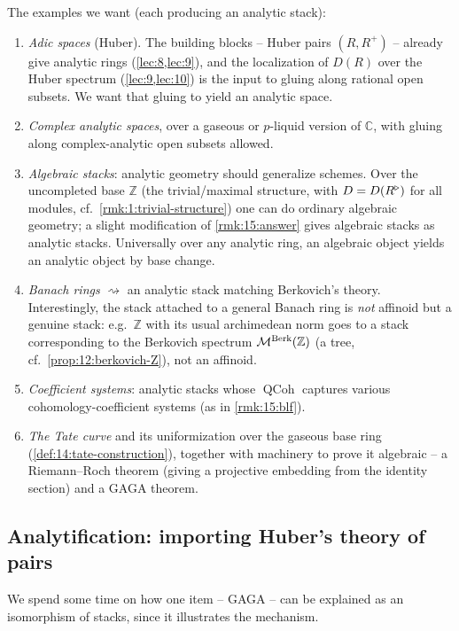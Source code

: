 \begin{remark}[Desiderata]
\label{rmk:15:desiderata}
The examples we want (each producing an analytic stack):
\begin{enumerate}
\item \emph{Adic spaces} (Huber). The building blocks -- Huber pairs $(R,R^+)$ --
already give analytic rings (\cref{lec:8,lec:9}), and the localization of
$D(R)$ over the Huber spectrum (\cref{lec:9,lec:10}) is the input to gluing along
rational open subsets. We want that gluing to yield an analytic space.
\item \emph{Complex analytic spaces}, over a gaseous or $p$-liquid version of
$\mathbb{C}$, with gluing along complex-analytic open subsets allowed.
\item \emph{Algebraic stacks}: analytic geometry should generalize schemes. Over the
uncompleted base $\mathbb{Z}$ (the trivial/maximal structure, with $D = D(R^{\triangleright})$ for
all modules, cf.\ \cref{rmk:1:trivial-structure}) one can do ordinary algebraic
geometry; a slight modification of \cref{rmk:15:answer} gives algebraic stacks as
analytic stacks. Universally over any analytic ring, an algebraic object yields an
analytic object by base change.
\item \emph{Banach rings} $\rightsquigarrow$ an analytic stack matching Berkovich's
theory. Interestingly, the stack attached to a general Banach ring is \emph{not}
affinoid but a genuine stack: e.g.\ $\mathbb{Z}$ with its usual archimedean norm goes
to a stack corresponding to the Berkovich spectrum $\mathcal{M}^{\mathrm{Berk}}(\mathbb{Z})$ (a tree,
cf.\ \cref{prop:12:berkovich-Z}), not an affinoid.
\item \emph{Coefficient systems}: analytic stacks whose $\operatorname{QCoh}$
captures various cohomology-coefficient systems (as in \cref{rmk:15:blf}).
\item \emph{The Tate curve} and its uniformization over the gaseous base ring
(\cref{def:14:tate-construction}), together with machinery to prove it algebraic --
a Riemann--Roch theorem (giving a projective embedding from the identity section)
and a GAGA theorem.
\end{enumerate}
\end{remark}

\subsection{Analytification: importing Huber's theory of pairs}

We spend some time on how one item -- GAGA -- can be explained as an isomorphism
of stacks, since it illustrates the mechanism.


